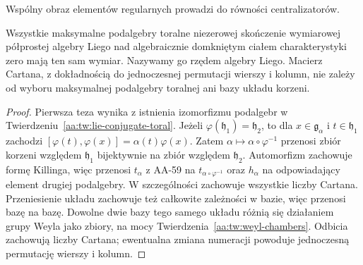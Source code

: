 \begin{center}

\small Wspólny obraz elementów regularnych prowadzi do równości centralizatorów.
\end{center}

\begin{wniosek}
\label{aa:cor:lie-rank-invariant}
Wszystkie maksymalne podalgebry toralne niezerowej skończenie wymiarowej półprostej algebry Liego nad algebraicznie domkniętym ciałem charakterystyki zero mają ten sam wymiar. Nazywamy go rzędem algebry Liego. Macierz Cartana, z dokładnością do jednoczesnej permutacji wierszy i kolumn, nie zależy od wyboru maksymalnej podalgebry toralnej ani bazy układu korzeni.
\end{wniosek}
\begin{proof}
Pierwsza teza wynika z istnienia izomorfizmu podalgebr w Twierdzeniu~\ref{aa:tw:lie-conjugate-toral}. Jeżeli $\varphi(\mathfrak h_1)=\mathfrak h_2$, to dla $x\in\mathfrak g_\alpha$ i $t\in\mathfrak h_1$ zachodzi $[\varphi(t),\varphi(x)]=\alpha(t)\varphi(x)$. Zatem $\alpha\mapsto\alpha\circ\varphi^{-1}$ przenosi zbiór korzeni względem $\mathfrak h_1$ bijektywnie na zbiór względem $\mathfrak h_2$. Automorfizm zachowuje formę Killinga, więc przenosi $t_\alpha$ z AA-59 na $t_{\alpha\circ\varphi^{-1}}$ oraz $h_\alpha$ na odpowiadający element drugiej podalgebry. W szczególności zachowuje wszystkie liczby Cartana. Przeniesienie układu zachowuje też całkowite zależności w bazie, więc przenosi bazę na bazę. Dowolne dwie bazy tego samego układu różnią się działaniem grupy Weyla jako zbiory, na mocy Twierdzenia~\ref{aa:tw:weyl-chambers}. Odbicia zachowują liczby Cartana; ewentualna zmiana numeracji powoduje jednoczesną permutację wierszy i kolumn.
\end{proof}

